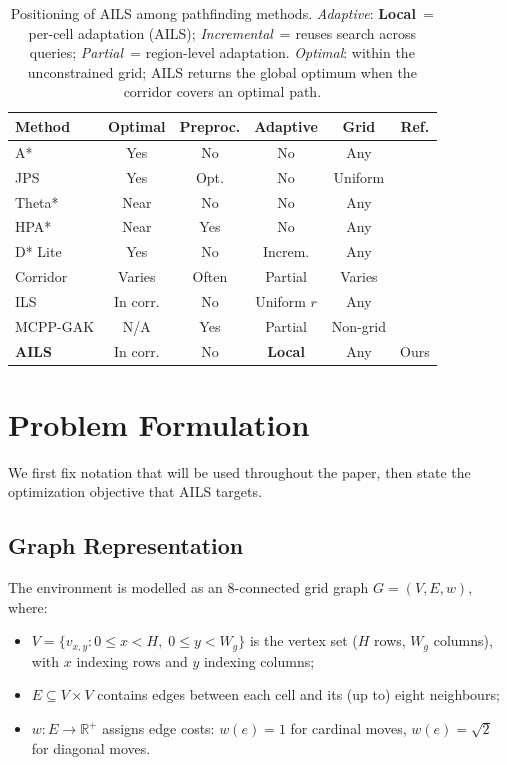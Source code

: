 \documentclass[journal]{IEEEtran}
\begin{document}
\begin{table}[h]
\centering
\caption{Positioning of AILS among pathfinding methods.
\emph{Adaptive}: \textbf{Local}~= per-cell adaptation (AILS); \emph{Incremental}~= reuses search across queries; \emph{Partial}~= region-level adaptation.
\emph{Optimal}: within the unconstrained grid; AILS returns the global optimum when the corridor covers an optimal path.}
\label{tab:comparison}
\footnotesize
\setlength{\tabcolsep}{4pt}
\begin{tabular}{lccccc}
\toprule
Method & Optimal & Preproc. & Adaptive & Grid & Ref. \\
\midrule
A* & Yes & No & No & Any & \cite{hart1968formal} \\
JPS & Yes & Opt. & No & Uniform & \cite{harabor2011online} \\
Theta* & Near & No & No & Any & \cite{nash2007theta} \\
HPA* & Near & Yes & No & Any & \cite{botea2004near} \\
D* Lite & Yes & No & Increm. & Any & \cite{koenig2002d} \\
Corridor & Varies & Often & Partial & Varies & \cite{huang2024corridor} \\
ILS & In corr. & No & Uniform $r$ & Any & \cite{elshahed2025ils} \\
MCPP-GAK & N/A & Yes & Partial & Non-grid & \cite{lee2025mcpp} \\
\textbf{AILS} & In corr. & No & \textbf{Local} & Any & Ours \\
\bottomrule
\end{tabular}
\normalsize
\end{table}

\section{Problem Formulation}
\label{sec:problem}

We first fix notation that will be used throughout the paper, then state the optimization objective that AILS targets.

\subsection{Graph Representation}

The environment is modelled as an 8-connected grid graph $G = (V, E, w)$, where:
\begin{itemize}
    \item $V = \{v_{x,y} : 0 \leq x < H,\; 0 \leq y < W_g\}$ is the vertex set ($H$ rows, $W_g$ columns), with $x$ indexing rows and $y$ indexing columns;
    \item $E \subseteq V \times V$ contains edges between each cell and its (up to) eight neighbours;
    \item $w : E \to \mathbb{R}^{+}$ assigns edge costs: $w(e) = 1$ for cardinal moves, $w(e) = \sqrt{2}$ for diagonal moves.
\end{itemize}
\end{document}
